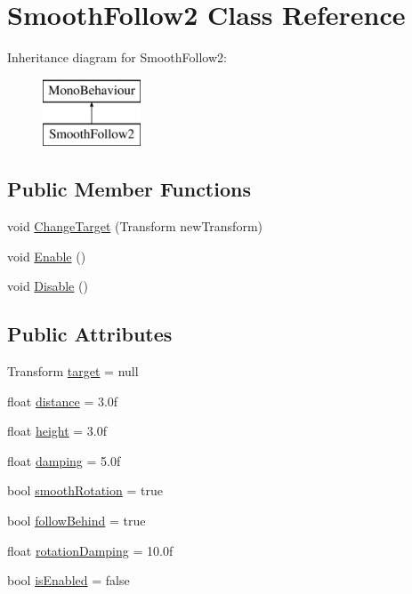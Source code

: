 \hypertarget{class_smooth_follow2}{}\section{Smooth\+Follow2 Class Reference}
\label{class_smooth_follow2}
Inheritance diagram for Smooth\+Follow2\+:\begin{figure}[H]
\begin{center}
\leavevmode
\includegraphics[height=2.000000cm]{class_smooth_follow2}
\end{center}
\end{figure}
\subsection*{Public Member Functions}
\begin{DoxyCompactItemize}
\item 
void \hyperlink{class_smooth_follow2_a13041dc329400ae56cf33327aadf15d1}{Change\+Target} (Transform new\+Transform)
\item 
void \hyperlink{class_smooth_follow2_addf84ee1fb5a167226683c5fafff763f}{Enable} ()
\item 
void \hyperlink{class_smooth_follow2_a23968d7abc2a9d3679feb08fe91b52e9}{Disable} ()
\end{DoxyCompactItemize}
\subsection*{Public Attributes}
\begin{DoxyCompactItemize}
\item 
Transform \hyperlink{class_smooth_follow2_a947df33a0028c7a23c05aa78821d78a0}{target} = null
\item 
float \hyperlink{class_smooth_follow2_aab094c74183e2da4f9bed5fb3e3f5cc8}{distance} = 3.\+0f
\item 
float \hyperlink{class_smooth_follow2_a3bfd9382b622037c08724a825e16b079}{height} = 3.\+0f
\item 
float \hyperlink{class_smooth_follow2_a1ed62a9925041bfe519860a66a1e32a1}{damping} = 5.\+0f
\item 
bool \hyperlink{class_smooth_follow2_afa5c565b89261e8fac01598585061789}{smooth\+Rotation} = true
\item 
bool \hyperlink{class_smooth_follow2_aa0d65efb0007a376b6b970c7da511a40}{follow\+Behind} = true
\item 
float \hyperlink{class_smooth_follow2_a62e856074bb0dd5cbc115d41c4e5a53b}{rotation\+Damping} = 10.\+0f
\item 
bool \hyperlink{class_smooth_follow2_a7cd7664186365e7e3107ca00c4c04682}{is\+Enabled} = false
\end{DoxyCompactItemize}
